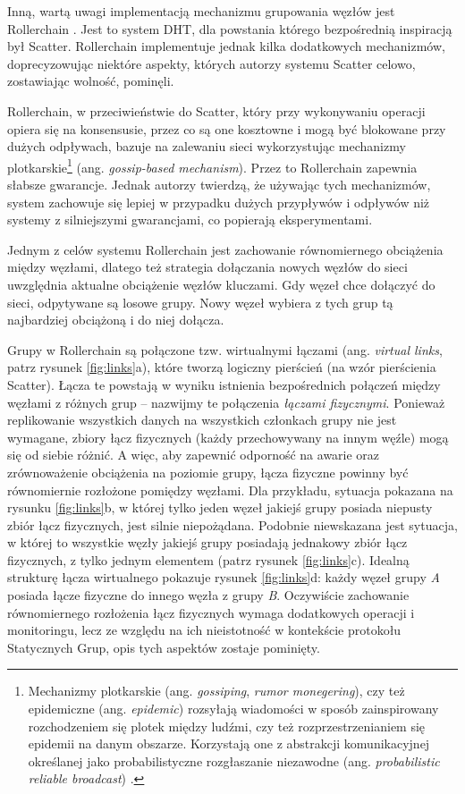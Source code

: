 \documentclass[12pt, twoside, openany]{report}
\begin{document}
Inną, wartą uwagi implementacją mechanizmu grupowania węzłów jest Rollerchain \cite{bib:rollerchain}. Jest to system DHT, dla powstania którego bezpośrednią inspiracją był Scatter. Rollerchain implementuje jednak kilka dodatkowych mechanizmów, doprecyzowując niektóre aspekty, których autorzy systemu Scatter celowo, zostawiając wolność, pominęli.

Rollerchain, w przeciwieństwie do Scatter, który przy wykonywaniu operacji opiera się na konsensusie, przez co są one kosztowne i mogą być blokowane przy dużych odpływach, bazuje na zalewaniu sieci wykorzystując mechanizmy plotkarskie\footnote{Mechanizmy plotkarskie (ang. \textit{gossiping}, \textit{rumor monegering}), czy też epidemiczne (ang. \textit{epidemic}) rozsyłają wiadomości w sposób zainspirowany rozchodzeniem się plotek między ludźmi, czy też rozprzestrzenianiem się epidemii na danym obszarze. Korzystają one z abstrakcji komunikacyjnej określanej jako probabilistyczne rozgłaszanie niezawodne (ang. \textit{probabilistic reliable broadcast}) \cite{bib:pr}.} (ang. \textit{gossip-based mechanism}). Przez to Rollerchain zapewnia słabsze gwarancje. Jednak autorzy twierdzą, że używając tych mechanizmów, system zachowuje się lepiej w przypadku dużych przypływów i odpływów niż systemy z silniejszymi gwarancjami, co popierają eksperymentami.

Jednym z celów systemu Rollerchain jest zachowanie równomiernego obciążenia między węzłami, dlatego też strategia dołączania nowych węzłów do sieci uwzględnia aktualne obciążenie węzłów kluczami. Gdy węzeł chce dołączyć do sieci, odpytywane są losowe grupy. Nowy węzeł wybiera z tych grup tą najbardziej obciążoną i do niej dołącza.

Grupy w Rollerchain są połączone tzw. wirtualnymi łączami (ang. \textit{virtual links}, patrz rysunek \ref{fig:links}a), które tworzą logiczny pierścień (na wzór pierścienia Scatter). Łącza te powstają w wyniku istnienia bezpośrednich połączeń między węzłami z różnych grup -- nazwijmy te połączenia \textit{łączami fizycznymi}. Ponieważ replikowanie wszystkich danych na wszystkich członkach grupy nie jest wymagane, zbiory łącz fizycznych (każdy przechowywany na innym węźle) mogą się od siebie różnić. A więc, aby zapewnić odporność na awarie oraz zrównoważenie obciążenia na poziomie grupy, łącza fizyczne powinny być równomiernie rozłożone pomiędzy węzłami. Dla przykładu, sytuacja pokazana na rysunku \ref{fig:links}b, w której tylko jeden węzeł jakiejś grupy posiada niepusty zbiór łącz fizycznych, jest silnie niepożądana. Podobnie niewskazana jest sytuacja, w której to wszystkie węzły jakiejś grupy posiadają jednakowy zbiór łącz fizycznych, z tylko jednym elementem (patrz rysunek \ref{fig:links}c). Idealną strukturę łącza wirtualnego pokazuje rysunek \ref{fig:links}d: każdy węzeł grupy \textit{A} posiada łącze fizyczne do innego węzła z grupy \textit{B}. Oczywiście zachowanie równomiernego rozłożenia łącz fizycznych wymaga dodatkowych operacji i monitoringu, lecz ze względu na ich nieistotność w kontekście protokołu Statycznych Grup, opis tych aspektów zostaje pominięty.
\end{document}
